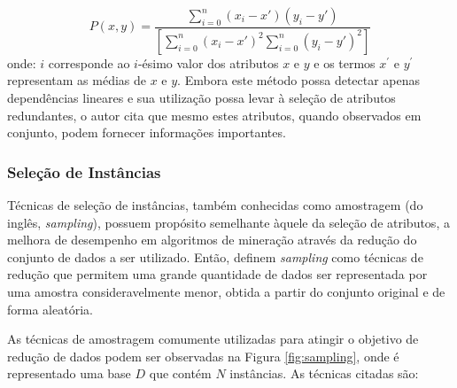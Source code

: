 \begin{equation}
    P\left ( x,y \right ) = \frac{\sum_{i=0}^{n}\left ( x_i-{x}' \right )\left ( y_i-{y}' \right )}{\left [ \sum_{i=0}^{n}\left ( x_i-{x}' \right )^{2} \sum_{i=0}^{n}\left ( y_i-{y}' \right )^{2} \right ]}
    \label{eq:pearson-corr}
\end{equation}
onde: $i$ corresponde ao $i$-ésimo valor dos atributos $x$ e $y$ e os termos $x^{'}$ e $y^{'}$ representam as médias de $x$ e $y$. Embora este método possa detectar apenas dependências lineares e sua utilização possa levar à seleção de atributos redundantes, o autor cita que mesmo estes atributos, quando observados em conjunto, podem fornecer informações importantes.

\subsubsection{Seleção de Instâncias}
\label{subsubsec:instance-selection}

Técnicas de seleção de instâncias, também conhecidas como amostragem (do inglês, \textit{sampling}), possuem propósito semelhante àquele da seleção de atributos, a melhora de desempenho em algoritmos de mineração através da redução do conjunto de dados a ser utilizado. Então,  definem \textit{sampling} como técnicas de redução que permitem uma grande quantidade de dados ser representada por uma amostra consideravelmente menor, obtida a partir do conjunto original e de forma aleatória.

As técnicas de amostragem comumente utilizadas para atingir o objetivo de redução de dados podem ser observadas na Figura \ref{fig:sampling}, onde é representado uma base $D$ que contém $N$ instâncias. As técnicas citadas são:

